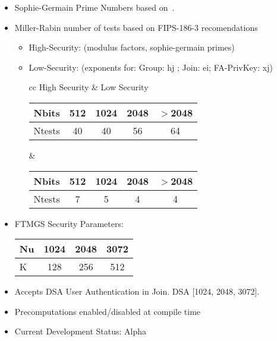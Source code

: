 \documentclass[a4paper]{article}
\begin{document}
\begin{itemize}
\item Sophie-Germain Prime Numbers based on~\cite{CS00}.

\item Miller-Rabin number of tests based on FIPS-186-3 recomendations
\begin{itemize}%
\item High-Security: (modulus factors, sophie-germain primes)
\item Low-Security: (exponents for: Group: hj ; Join: ei; FA-PrivKey: xj)
\begin{center}\footnotesize
\begin{tabular}{cc}
High Security & Low Security \\
\begin{tabular}{l|cccc}\hline
Nbits  & 512 & 1024 & 2048 & $>$2048 \\\hline
Ntests &  40 &   40 &   56 & 64 \\\hline
\end{tabular}
&
\begin{tabular}{l|cccc}\hline
Nbits  & 512 & 1024 & 2048 & $>$2048 \\\hline
Ntests &   7 &    5 &    4 & 4 \\\hline
\end{tabular}
\end{tabular}
\end{center}
\end{itemize}%

\item FTMGS Security Parameters:
\begin{center}\footnotesize
\begin{tabular}{l|ccc}\hline
Nu  & 1024 & 2048 & 3072 \\\hline
K   &  128 &  256 &  512 \\\hline
\end{tabular}
\end{center}

\item Accepts DSA User Authentication in Join. DSA [1024, 2048, 3072].

\item Precomputations enabled/disabled at compile time

\item Current Development Status: Alpha


\end{itemize}
\end{document}
